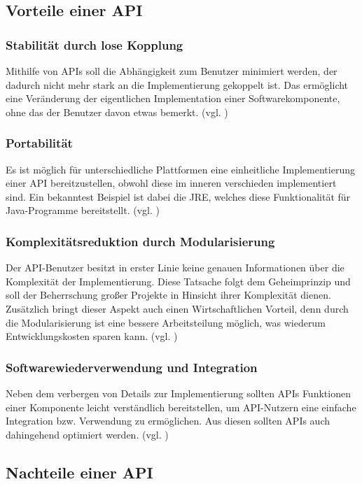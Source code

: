 \subsection{Vorteile einer \gls{API}}
\subsubsection{Stabilität durch lose Kopplung}
Mithilfe von \glspl{API} soll die Abhängigkeit zum Benutzer minimiert werden, der dadurch nicht mehr stark an die Implementierung gekoppelt ist. Das ermöglicht eine Veränderung der eigentlichen Implementation einer Softwarekomponente, ohne das der Benutzer davon etwas bemerkt. (vgl. \cite[9]{apiDesign})

\subsubsection{Portabilität}
Es ist möglich für unterschiedliche Plattformen eine einheitliche Implementierung einer \gls{API} bereitzustellen, obwohl diese im inneren verschieden implementiert sind. Ein bekanntest Beispiel ist dabei die \gls{JRE}, welches diese Funktionalität für Java-Programme bereitstellt. (vgl. \cite[9]{apiDesign})

\subsubsection{Komplexitätsreduktion durch Modularisierung}
Der \gls{API}-Benutzer besitzt in erster Linie keine genauen Informationen über die Komplexität der Implementierung. Diese Tatsache folgt dem Geheimprinzip und soll der Beherrschung großer Projekte in Hinsicht ihrer Komplexität dienen. Zusätzlich bringt dieser Aspekt auch einen Wirtschaftlichen Vorteil, denn durch die Modularisierung ist eine bessere Arbeitsteilung möglich, was wiederum Entwicklungskosten sparen kann. (vgl. \cite[10]{apiDesign})

\subsubsection{Softwarewiederverwendung und Integration}
Neben dem verbergen von Details zur Implementierung sollten \glspl{API} Funktionen einer Komponente leicht verständlich bereitstellen, um \gls{API}-Nutzern eine einfache Integration bzw. Verwendung zu ermöglichen. Aus diesen sollten \glspl{API} auch dahingehend optimiert werden. (vgl. \cite[10]{apiDesign})

\subsection{Nachteile einer \gls{API}}
